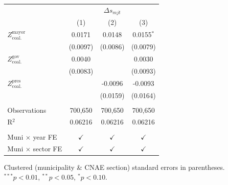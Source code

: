 \begingroup
\centering
\begin{tabular}{lccc}
   \toprule
    & \multicolumn{3}{c}{$\Delta s_{mjt}$}\\
                                       & (1)           & (2)           & (3)\\  
   \midrule 
   $Z^{\text{mayor}}_{\text{coal.}}$   & 0.0171        & 0.0148        & 0.0155$^{*}$\\   
                                       & (0.0097)      & (0.0086)      & (0.0079)\\   
   $Z^{\text{gov}}_{\text{coal.}}$     & 0.0040        &               & 0.0030\\   
                                       & (0.0083)      &               & (0.0093)\\   
   $Z^{\text{pres}}_{\text{coal.}}$    &               & -0.0096       & -0.0093\\   
                                       &               & (0.0159)      & (0.0164)\\   
    \\
   Observations                        & 700,650       & 700,650       & 700,650\\  
   R$^2$                               & 0.06216       & 0.06216       & 0.06216\\  
    \\
   Muni $\times$ year FE               & $\checkmark$  & $\checkmark$  & $\checkmark$\\   
   Muni $\times$ sector FE             & $\checkmark$  & $\checkmark$  & $\checkmark$\\   
   \bottomrule
\end{tabular}
 
\par \raggedright 
Clustered (municipality \& CNAE section) standard errors in parentheses. $^{***}p<0.01$, $^{**}p<0.05$, $^{*}p<0.10$.
\par\endgroup

